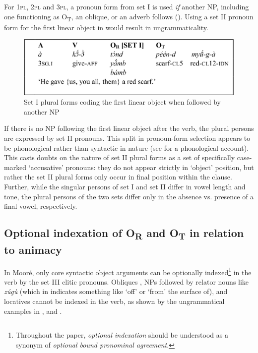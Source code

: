 \documentclass[output=paper]{langsci/langscibook}
\begin{document}
For 1\textsc{pl}, 2\textsc{pl} and 3\textsc{pl}, a pronoun form from set I is used \textit{if} another NP, including one functioning as O\textsubscript{T}, an oblique, or an adverb follows (). Using a set II pronoun form for the first linear object in  would result in ungrammaticality.

\begin{figure}[h]
\includegraphics[width=\textwidth]{figures/pacchiarottifig2}
\caption{Set I plural forms coding the first linear object when followed by another NP}
\label{fig:2.pacchiarotti}
\end{figure}

If there is no NP following the first linear object after the verb, the plural persons are expressed by set II pronouns. This split in pronoun-form selection appears to be phonological rather than syntactic in nature (see \citealt{peterson1971} for a phonological account). This casts doubts on the nature of set II plural forms as a set of specifically case-marked `accusative' pronouns: they do not appear strictly in `object' position, but rather the set II plural forms only occur in final position within the clause. Further, while the singular persons of set I and set II differ in vowel length and tone, the plural persons of the two sets differ only in the absence vs. presence of a final vowel, respectively. 

\subsection{Optional indexation of O\textsubscript{R} and O\textsubscript{T} in relation to animacy}\label{§4.4:optional.pacchiarotti}

In Mooré, only core syntactic object arguments can be optionally indexed\footnote{Throughout the paper, \textit{optional indexation} should be understood as a synonym of \textit{optional bound pronominal agreement}.} in the verb by the set III clitic pronouns. Obliques , NPs followed by relator nouns like \emph{zúgù} (which in  indicates something like `off' or `from' the surface of), and locatives  cannot be indexed in the verb, as shown by the ungrammatical examples in ,  and . 
\end{document}
